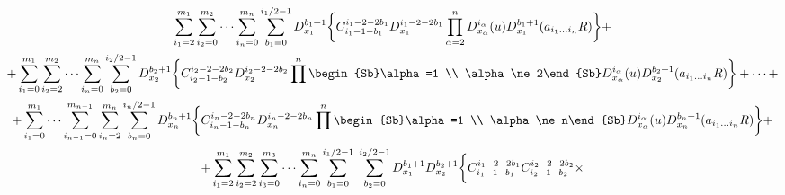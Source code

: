 \begin{multline} 


\sum^{m_1}_{i_1=2}\sum^{m_2}_{i_2=0}\dotsb 


\sum^{m_n}_{i_n=0}\sum^{i_1/2-1}_{b_1=0}D^{b_1+1}_{x_1}\bigg\{ 


C^{i_1-2-2b_1}_{i_1-1-b_1}D^{i_1-2-2b_1}_{x_1}\prod^n_{\alpha=2} 


D^{i_\alpha}_{x_\alpha}(u)D^{b_1+1}_{x_1} 


(a_{i_1\dotsc i_n}R)\bigg\}+ \\ 


% 


+\sum^{m_1}_{i_1=0}\sum^{m_2}_{i_2=2}\dotsb 


\sum^{m_n}_{i_n=0}\sum^{i_2/2-1}_{b_2=0} 


D^{b_2+1}_{x_2}\bigg\{


C^{i_2-2-2b_2}_{i_2-1-b_2}D^{i_2-2-2b_2}_{x_2} 


\prod^n\begin{Sb}\alpha=1 \\ \alpha\ne2\end{Sb} 


D^{i_\alpha}_{x_\alpha}(u)D^{b_2+1}_{x_2} 


(a_{i_1\dotsc i_n}R)\bigg\}+\dotsb+ \\ 


% 


+\sum^{m_1}_{i_1=0}\dotsb\sum^{m_{n-1}}_{i_{n-1}=0} 


\sum^{m_n}_{i_n=2}\sum^{i_n/2-1}_{b_n=0} 


D^{b_n+1}_{x_n}\bigg\{


C^{i_n-2-2b_n}_{i_n-1-b_n}D^{i_n-2-2b_n}_{x_n} 


\prod^n\begin{Sb}\alpha=1 \\ \alpha\ne n\end{Sb} 


D^{i_\alpha}_{x_\alpha}(u)D^{b_n+1}_{x_n} 


(a_{i_1\dotsc i_n}R)\bigg\}+ \\


% 


+\sum^{m_1}_{i_1=2}\sum^{m_2}_{i_2=2}\sum^{m_3}_{i_3=0}\dotsb 


\sum^{m_n}_{i_n=0}\sum^{i_1/2-1}_{b_1=0}\; 


\sum^{i_2/2-1}_{b_2=0}D^{b_1+1}_{x_1}D^{b_2+1}_{x_2}\bigg\{ 


C^{i_1-2-2b_1}_{i_1-1-b_1}C^{i_2-2-2b_2}_{i_2-1-b_2}\times \\ 



\end{multline}
